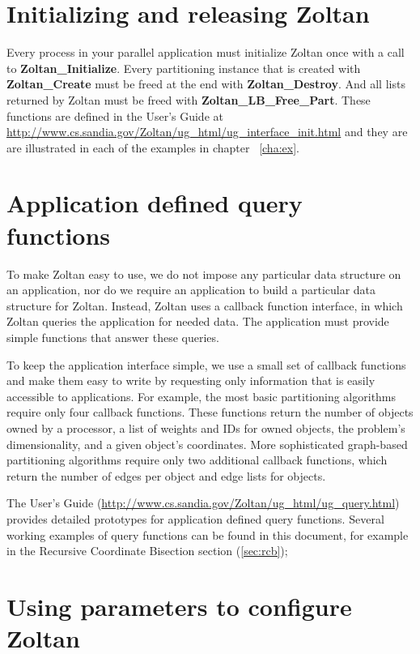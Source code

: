 \section{Initializing and releasing Zoltan}

Every process in your parallel application must initialize Zoltan once
with a call to \textbf{Zoltan\_Initialize}.  Every
partitioning instance that is created with \textbf{Zoltan\_Create} must be freed at
the end with \textbf{Zoltan\_Destroy}.  And all lists returned by
Zoltan must be freed with \textbf{Zoltan\_LB\_Free\_Part}.  These functions
are defined in the User's Guide at
\url{http://www.cs.sandia.gov/Zoltan/ug\_html/ug\_interface\_init.html}
and they are are illustrated in each of the examples in chapter ~\ref{cha:ex}.

\section{Application defined query functions}

To make Zoltan easy to use, we do not impose any particular data structure
on an application, nor do we require an application to build a particular
data structure for Zoltan. Instead, Zoltan uses a callback function interface,
in which Zoltan queries the application for needed data. The application must
provide simple functions that answer these queries.

To keep the application interface simple, we use a small set of callback functions
and make them easy to write by requesting only information that is easily accessible
to applications. For example, the most basic partitioning algorithms require only
four callback functions. These functions return the number of objects owned by a
processor, a list of weights and IDs for owned objects, the problem's dimensionality,
and a given object's coordinates. More sophisticated graph-based partitioning
algorithms require only two additional callback functions, which return the number
of edges per object and edge lists for objects.

The User's Guide
(\url{http://www.cs.sandia.gov/Zoltan/ug\_html/ug\_query.html})
provides detailed prototypes for application defined query functions.
Several working examples of query functions can be found in this document,
for example in the Recursive Coordinate Bisection section (\ref{sec:rcb});

\section{Using parameters to configure Zoltan}

